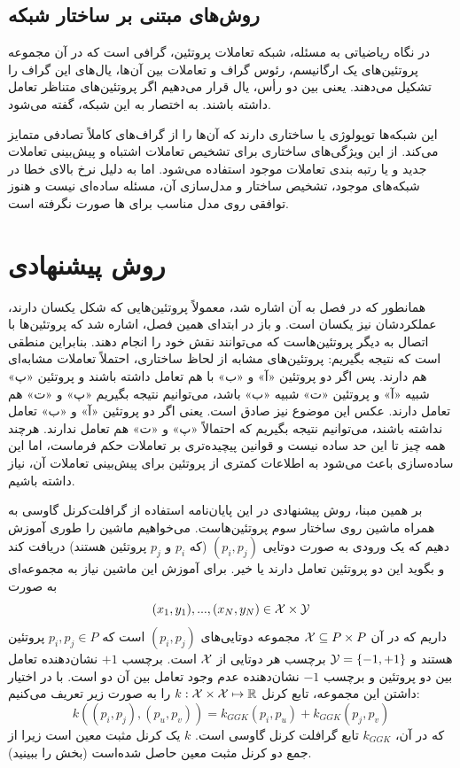 \subsection{روش‌های مبتنی بر ساختار شبکه}
در نگاه ریاضیاتی به مسئله، شبکه تعاملات پروتئین، گرافی است که در آن مجموعه
پروتئین‌های یک ارگانیسم، رئوس گراف و تعاملات بین آن‌ها، یال‌های این گراف را تشکیل می‌دهند. یعنی بین دو رأس، یال قرار می‌دهیم اگر پروتئین‌های متناظر تعامل داشته باشند. به اختصار به این شبکه‌،  گفته می‌شود.

این شبکه‌ها توپولوژی یا ساختاری دارند که آن‌ها را از گراف‌های کاملاً تصادفی متمایز می‌کند. از این ویژگی‌های ساختاری برای تشخیص تعاملات اشتباه و پیش‌بینی تعاملات جدید و یا رتبه بندی تعاملات موجود استفاده می‌شود. اما به دلیل نرخ بالای خطا در شبکه‌های موجود، تشخیص ساختار و مدل‌سازی آن، مسئله ساده‌ای نیست و هنوز توافقی روی مدل مناسب برای ها صورت نگرفته است.

\section{روش پیشنهادی}
همانطور که در فصل  به آن اشاره شد، معمولاً پروتئین‌هایی که شکل یکسان دارند، عملکردشان نیز یکسان است. و باز در ابتدای همین فصل، اشاره شد که پروتئین‌ها با اتصال به دیگر پروتئین‌هاست که می‌توانند نقش خود را انجام دهند. بنابراین منطقی است که نتیجه بگیریم: پروتئین‌های مشابه از لحاظ ساختاری، احتملاً تعاملات مشابه‌ای هم دارند. پس اگر دو پروتئین «آ» و «ب» با هم تعامل داشته باشند و پروتئین «پ» شبیه «آ» و پروتئین «ت» شبیه «ب» باشد، می‌توانیم نتیجه بگیریم «پ» و «ت» هم تعامل دارند. عکس این موضوع نیز صادق است. یعنی اگر دو پروتئین «آ» و «ب» تعامل نداشته باشند، می‌توانیم نتیجه بگیریم که احتمالاً «پ» و «ت» هم تعامل ندارند. هرچند همه چیز تا این حد ساده نیست و قوانین پیچیده‌تری بر تعاملات حکم فرماست، اما این ساده‌سازی باعث می‌شود به اطلاعات کمتری از پروتئین برای پیش‌بینی تعاملات آن، نیاز داشته باشیم.

بر همین مبنا، روش پیشنهادی در این پایان‌نامه استفاده از گرافلت‌کرنل گاوسی به همراه ماشین  روی ساختار سوم پروتئین‌هاست. می‌خواهیم ماشین  را طوری آموزش دهیم که یک ورودی به صورت دوتایی $(p_i,p_j)$ (که $p_i$ و $p_j$ پروتئین هستند) دریافت کند و بگوید این دو پروتئین تعامل دارند یا خیر. برای آموزش این ماشین نیاز به مجموعه‌ای به صورت
\begin{equation*}
(x_1,y_1),...,(x_N,y_N) \in \mathcal{X} \times \mathcal{Y}
\end{equation*}
داریم که در آن $\mathcal{X} \subseteq P\times P$ مجموعه دوتایی‌های $(p_i,p_j)$ است که $p_i,p_j \in P$ پروتئین هستند و  $\mathcal{Y} = \left\lbrace-1,+1 \right\rbrace$ برچسب هر دوتایی از $\mathcal{X}$ است. برچسب $+1$ نشان‌دهنده تعامل بین دو پروتئین و برچسب $-1$ نشان‌دهنده عدم وجود تعامل بین آن دو است. با در اختیار داشتن این مجموعه، تابع کرنل $k: \mathcal{X}\times \mathcal{X} \mapsto \mathbb{R}$ را به صورت زیر تعریف می‌کنیم:
\begin{equation*}
k((p_i,p_j),(p_u,p_v)) = k_{GGK}(p_i,p_u) + k_{GGK}(p_j,p_v)
\end{equation*}
که در آن، $k_{GGK}$ تابع گرافلت کرنل گاوسی است. $k$ یک کرنل مثبت معین است زیرا از جمع دو کرنل مثبت معین حاصل شده‌است (بخش  را ببینید).

